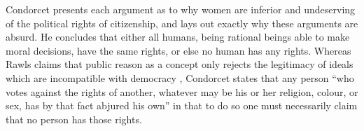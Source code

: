 Condorcet presents each argument as to why women are inferior and undeserving of the political rights of citizenship, and lays out exactly why these arguments are absurd.  He concludes that either all humans, being rational beings able to make moral decisions, have the same rights, or else no human has any rights.  Whereas Rawls claims that public reason as a concept only rejects the legitimacy of ideals which are incompatible with democracy \autocite{Rawls1997}, Condorcet states that any person ``who votes against the rights of another, whatever may be his or her religion, colour, or sex, has by that fact abjured his own'' in that to do so one must necessarily claim that no person has those rights.
